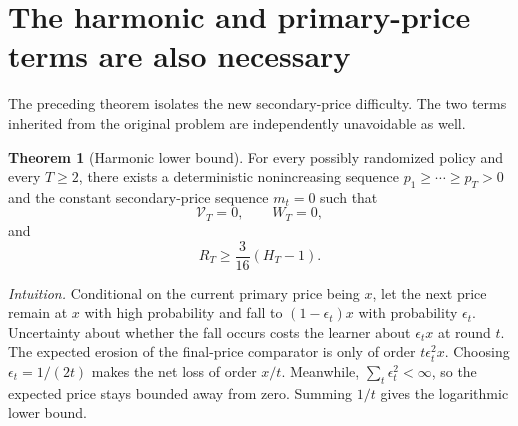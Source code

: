 \documentclass[11pt]{article}
\theoremstyle{definition}
\newtheorem{theorem}{Theorem}
\begin{document}
\section{The harmonic and primary-price terms are also necessary}
\label{sec:the-harmonic-and-primary-price-terms-are-also-necessary}

The preceding theorem isolates the new secondary-price difficulty. The
two terms inherited from the original problem are independently
unavoidable as well.

\begin{theorem}[Harmonic lower bound]
\label{thm:harmonic-lower-bound}
For every possibly randomized policy and every $T\ge2$, there exists a
deterministic nonincreasing sequence
$p_1\ge\cdots\ge p_T>0$ and the constant secondary-price sequence
$m_t=0$ such that
\[
    \mathcal{V}_T=0,
    \qquad
    W_T=0,
\]
and
\[
    R_T\ge\frac{3}{16}(H_T-1).
\]
\end{theorem}

\emph{Intuition.}
Conditional on the current primary price being $x$, let the next price
remain at $x$ with high probability and fall to
$(1-\epsilon_t)x$ with probability $\epsilon_t$. Uncertainty about
whether the fall occurs costs the learner about $\epsilon_t x$ at round
$t$. The expected erosion of the final-price comparator is only of
order $t\epsilon_t^2x$. Choosing $\epsilon_t=1/(2t)$ makes the net loss
of order $x/t$. Meanwhile, $\sum_t\epsilon_t^2<\infty$, so the expected
price stays bounded away from zero. Summing $1/t$ gives the logarithmic
lower bound.
\end{document}

